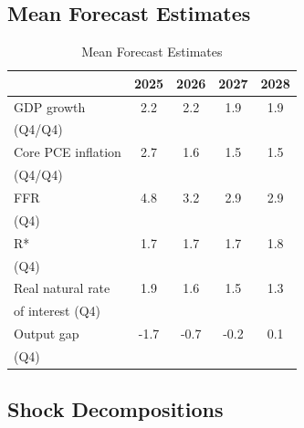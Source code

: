 \documentclass{article}
\begin{document}
\subsection{Mean Forecast Estimates}
\begin{table}[h!]
\centering
\begin{tabular}{l | c | c | c | c }
& 2025 & 2026 & 2027 & 2028 \\
\hline
\hline
GDP growth                        & 2.2 & 2.2 & 1.9 & 1.9 \\
(Q4/Q4)                           &     &     &     &     \\
\hline
Core PCE inflation                & 2.7 & 1.6 & 1.5 & 1.5 \\
(Q4/Q4)                           &     &     &     &     \\
\hline
FFR                               & 4.8 & 3.2 & 2.9 & 2.9 \\
(Q4)                              &     &     &     &     \\
\hline
R*                                & 1.7 & 1.7 & 1.7 & 1.8 \\
(Q4)                              &     &     &     &     \\
\hline
Real natural rate                 & 1.9 & 1.6 & 1.5 & 1.3 \\
of interest (Q4)                  &     &     &     &     \\
\hline
Output gap                        & -1.7 & -0.7 & -0.2 & 0.1 \\
(Q4)                              &     &     &     &     \\
\end{tabular}\caption{Mean Forecast Estimates}
\end{table}\clearpage
\subsection{Shock Decompositions}
\end{document}
